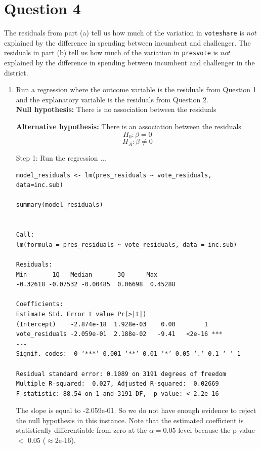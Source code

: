 \documentclass[12pt,letterpaper]{article}
\begin{document}
\section*{Question 4}
\noindent The residuals from part (a) tell us how much of the variation in \texttt{voteshare} is $not$ explained by the difference in spending between incumbent and challenger. The residuals in part (b) tell us how much of the variation in \texttt{presvote} is $not$ explained by the difference in spending between incumbent and challenger in the district.
	\begin{enumerate}
		\item Run a regression where the outcome variable is the residuals from Question 1 and the explanatory variable is the residuals from Question 2.	\\
		
\textbf{		Null hypothesis: }
		There is no association between the residuals
		
\textbf{		Alternative hypothesis: }
		There is an association between the residuals \\

	$$H_0: \beta = 0$$
$$H_A: \beta \neq 0$$

\vspace{.25cm}


Step 1: Run the regression ...

			\begin{verbatim}
model_residuals <- lm(pres_residuals ~ vote_residuals, data=inc.sub)

summary(model_residuals)


Call:
lm(formula = pres_residuals ~ vote_residuals, data = inc.sub)

Residuals:
Min       1Q   Median       3Q      Max 
-0.32618 -0.07532 -0.00485  0.06698  0.45288 

Coefficients:
Estimate Std. Error t value Pr(>|t|)    
(Intercept)    -2.874e-18  1.928e-03    0.00        1    
vote_residuals -2.059e-01  2.188e-02   -9.41   <2e-16 ***
---
Signif. codes:  0 ‘***’ 0.001 ‘**’ 0.01 ‘*’ 0.05 ‘.’ 0.1 ‘ ’ 1

Residual standard error: 0.1089 on 3191 degrees of freedom
Multiple R-squared:  0.027,	Adjusted R-squared:  0.02669 
F-statistic: 88.54 on 1 and 3191 DF,  p-value: < 2.2e-16

		\end{verbatim}
		
The slope is equal to -2.059e-01. So we do not have enough evidence to reject the null hypothesis in this instance. Note that the estimated coefficient is statistically differentiable from zero at the $\alpha=0.05$ level because the p-value  $<$ 0.05 ($\approx $2e-16).
	

\end{enumerate}
\end{document}
